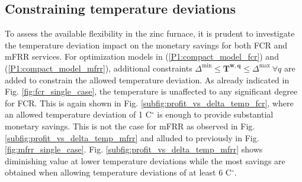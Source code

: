 \documentclass[conference]{IEEEtran}
\begin{document}
\subsection{Constraining temperature deviations}
\vspace{-1mm}
To assess the available flexibility in the zinc furnace, it is prudent to investigate the temperature deviation impact on the monetary savings for both FCR and mFRR services. For optimization models in (\ref{P1:compact_model_fcr}) and (\ref{P1:compact_model_mfrr}), additional constraints $ \Delta^{\text{min}} \leq \bm{T^{w,q}} \leq \Delta^{\text{max}} \ \forall{q}$ are added to constrain the allowed temperature deviation.
%
As already indicated  in Fig. \ref{fig:fcr_single_case}, the temperature is unaffected to any significant degree for FCR. This is again shown in Fig. \ref{subfig:profit_vs_delta_temp_fcr}, where an allowed temperature deviation of 1 C$^{\circ}$ is enough to provide substantial monetary savings. This is not the case for mFRR as observed in Fig. \ref{subfig:profit_vs_delta_temp_mfrr} and alluded to previously in Fig. \ref{fig:mfrr_single_case}. Fig. \ref{subfig:profit_vs_delta_temp_mfrr} shows diminishing value at lower temperature deviations while the most savings are obtained when allowing temperature deviations of at least 6 C$^{\circ}$.





\end{document}
